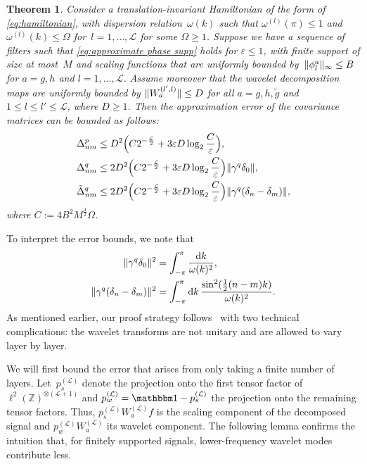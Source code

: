 \documentclass[submission, Phys]{SciPost}
\newtheorem{thm}{Theorem}\crefname{thm}{Theorem}{Theorems}
\theoremstyle{definition}
\theoremstyle{remark}
\DeclarePairedDelimiter{\norm}{\lVert}{\rVert}
\newcommand{\ZZ}{\mathbb Z}
\newcommand{\ot}{\otimes}
\newcommand{\eps}{\varepsilon}
\newcommand{\id}{\mathbbm 1}
\renewcommand{\d}{\ensuremath{\mathrm{d}}}
\newcommand{\cL}{\mathcal L}
\newcommand{\wnorm}{D}
\begin{document}
\begin{appendix}
\begin{thm}\label{thm:approximation}
Consider a translation-invariant Hamiltonian of the form of \cref{eq:hamiltonian}, with dispersion relation~$\omega(k)$ such that $\omega^{(l)}(\pi) \leq 1$ and $\omega^{(l)}(k) \leq \Omega$ for~$l=1,\dots,\cL$ for some $\Omega \geq 1$.
Suppose we have a sequence of filters such that \cref{eq:approximate phase supp} holds for $\eps \leq 1$, with finite support of size at most~$M$ and scaling functions that are uniformly bounded by~$\norm{\phi^a_l}_\infty \leq B$ for $a=g,h$ and $l=1,\dots,\cL$.
Assume moreover that the wavelet decomposition maps are uniformly bounded by $\norm{W^{(l',l)}_a} \leq \wnorm$ for all $a = g,h,\tilde{g}$ and $1\leq l\leq l'\leq\cL$, where $D\geq1$.
Then the approximation error of the covariance matrices can be bounded as follows:
\begin{equation*}\begin{aligned}
\Delta^p_{nm} &\leq \wnorm^2\Bigl(C2^{-\frac{\cL}2} + 3\eps \wnorm  \log_2 \frac{C}{\eps}\Bigr), \\
\Delta^q_{nm} &\leq 2\wnorm^2\Bigl(C2^{-\frac{\cL}2} + 3\eps \wnorm \log_2 \frac{C}{\eps}\Bigr) \norm{\gamma^q \delta_0}, \\
\tilde\Delta^q_{nm} &\leq 2\wnorm^2\Bigl(C2^{-\frac{\cL}2} + 3\eps \wnorm \log_2 \frac{C}{\eps}\Bigr) \norm{\gamma^q(\delta_n - \delta_m)},
\end{aligned}\end{equation*}
where $C := 4B^2 M^{\frac32}\Omega$.
\end{thm}

\noindent
To interpret the error bounds, we note that
\begin{align}
\label{eq:first norm interp}
  \norm{\gamma^q \delta_0}^2 &= \int_{-\pi}^{\pi}\frac{\d k}{\omega(k)^2}, \\
\label{eq:second norm interp}
  \norm{\gamma^q(\delta_n - \delta_m)}^2
&= \int_{-\pi}^{\pi} \d k \, \frac{\sin^2(\frac12(n-m)k)}{\omega(k)^2}.
\end{align}
As mentioned earlier, our proof strategy follows~\cite{haegeman2018rigorous} with two technical complications:
the wavelet transforms are not unitary and are allowed to vary layer by layer.

We will first bound the error that arises from only taking a finite number of layers.
Let~$p^{(\cL)}_s$ denote the projection onto the first tensor factor of $\ell^2(\ZZ)^{\ot(\cL + 1)}$ and $p^{(\cL)}_w = \id - p^{(\cL)}_s$ the projection onto the remaining tensor factors.
Thus, $p^{(\cL)}_s W_a^{(\cL)} f$ is the scaling component of the decomposed signal and $p^{(\cL)}_w W_a^{(\cL)}$ its wavelet component.
The following lemma confirms the intuition that, for finitely supported signals, lower-frequency wavelet modes contribute less.


\end{appendix}
\end{document}
